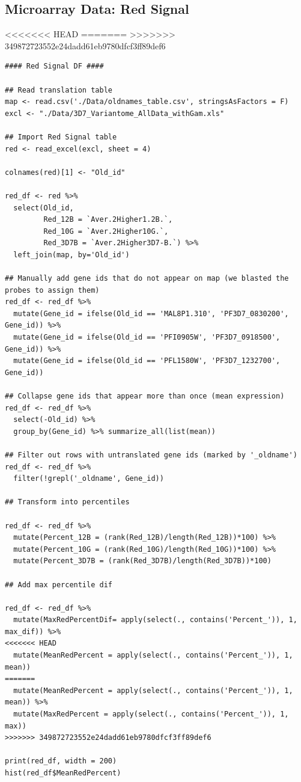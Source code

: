 \documentclass[11pt]{article}
\begin{document}
\subsection{Microarray Data: Red Signal}
<<<<<<< HEAD
\label{sec:org614a51c}
=======
\label{sec:org74fa92d}
>>>>>>> 349872723552e24dadd61eb9780dfcf3ff89def6

\begin{verbatim}
#### Red Signal DF ####

## Read translation table
map <- read.csv('./Data/oldnames_table.csv', stringsAsFactors = F)
excl <- "./Data/3D7_Variantome_AllData_withGam.xls"

## Import Red Signal table
red <- read_excel(excl, sheet = 4)

colnames(red)[1] <- "Old_id"

red_df <- red %>%
  select(Old_id,
         Red_12B = `Aver.2Higher1.2B.`,
         Red_10G = `Aver.2Higher10G.`,
         Red_3D7B = `Aver.2Higher3D7-B.`) %>%
  left_join(map, by='Old_id')

## Manually add gene ids that do not appear on map (we blasted the probes to assign them)
red_df <- red_df %>%
  mutate(Gene_id = ifelse(Old_id == 'MAL8P1.310', 'PF3D7_0830200', Gene_id)) %>%
  mutate(Gene_id = ifelse(Old_id == 'PFI0905W', 'PF3D7_0918500', Gene_id)) %>%
  mutate(Gene_id = ifelse(Old_id == 'PFL1580W', 'PF3D7_1232700', Gene_id))

## Collapse gene ids that appear more than once (mean expression)
red_df <- red_df %>%
  select(-Old_id) %>%
  group_by(Gene_id) %>% summarize_all(list(mean))

## Filter out rows with untranslated gene ids (marked by '_oldname')
red_df <- red_df %>%
  filter(!grepl('_oldname', Gene_id))

## Transform into percentiles

red_df <- red_df %>%
  mutate(Percent_12B = (rank(Red_12B)/length(Red_12B))*100) %>%
  mutate(Percent_10G = (rank(Red_10G)/length(Red_10G))*100) %>%
  mutate(Percent_3D7B = (rank(Red_3D7B)/length(Red_3D7B))*100)

## Add max percentile dif

red_df <- red_df %>%
  mutate(MaxRedPercentDif= apply(select(., contains('Percent_')), 1, max_dif)) %>%
<<<<<<< HEAD
  mutate(MeanRedPercent = apply(select(., contains('Percent_')), 1, mean))
=======
  mutate(MeanRedPercent = apply(select(., contains('Percent_')), 1, mean)) %>%
  mutate(MaxRedPercent = apply(select(., contains('Percent_')), 1, max))
>>>>>>> 349872723552e24dadd61eb9780dfcf3ff89def6

print(red_df, width = 200)
hist(red_df$MeanRedPercent)
\end{verbatim}
\end{document}
